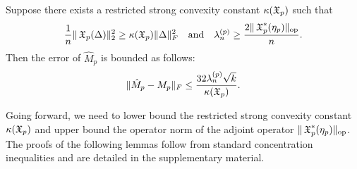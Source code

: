 



\begin{lemma}
\label{lem:lowRank}
Suppose there exists a restricted strong convexity constant $\kappa(\operatorname{\mathfrak{X}}_p)$ such that
$$\frac{1}{n} \| \operatorname{\mathfrak{X}}_p( \Delta )\|_2^2 \ge \kappa(\operatorname{\mathfrak{X}}_p) \|\Delta\|^2_F \quad \text{and} \quad
\lambda^{(p)}_n \ge \frac{2 \|\operatorname{\mathfrak{X}}_p^*(\eta_p)\|_{\text{\rm op}}}{n}.$$
Then the error of $\hat M_p$ is bounded as follows:
$$\| \hat M_p - M_p \|_F \le \frac{32 \lambda^{(p)}_n \sqrt{k}}{\kappa(\operatorname{\mathfrak{X}}_p)}.$$
\end{lemma}

Going forward, we need to lower bound the restricted strong convexity
constant $\kappa(\operatorname{\mathfrak{X}}_p)$ and upper bound the operator norm of the adjoint operator
$\|\operatorname{\mathfrak{X}}_p^*(\eta_p)\|_{\text{\rm op}}$. The proofs of the following lemmas follow
from standard concentration inequalities and are detailed in the
supplementary material.

